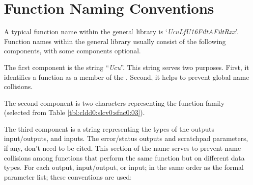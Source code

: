\section{Function Naming Conventions}
\label{cldd0:sfnc0}

A typical function name within the general library is 
`\emph{UcuLfU16FiltAFiltRxx}'.  Function names within the 
general library usually consist of the following components, 
with some components optional.  

The first component is the string ``\emph{Ucu}''\@.  This 
string serves two purposes.  First, it identifies a function 
as a member of the \emph{\productbasenameshort{}}.  Second, 
it helps to prevent global name collisions.  

The second component is two characters representing the 
function family (selected from Table 
\ref{tbl:cldd0:slcv0:sfnc0:03}).  

The third component is a string representing the types of 
the outputs input/outputs, and inputs.  The error/status 
outputs and scratchpad parameters, if any, don't need to be 
cited.  This section of the name serves to prevent name 
collisions among functions that perform the same function 
but on different data types.  For each output, input/output, 
or input; in the same order as the formal parameter list; 
these conventions are used: 

